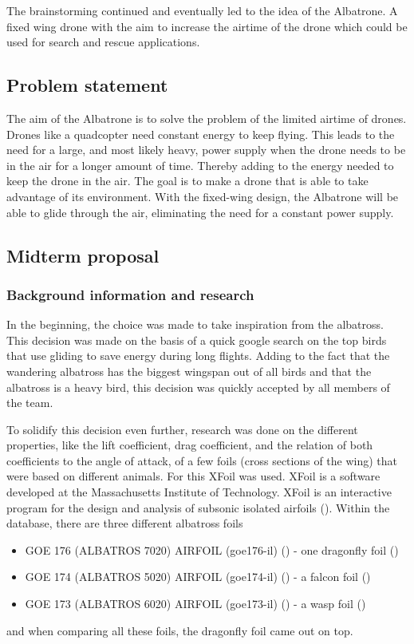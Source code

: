 The brainstorming continued and eventually led to the idea of the Albatrone. A fixed wing drone with the aim to increase the airtime of the drone which could be used for search and rescue applications.  

\subsection{Problem statement}
The aim of the Albatrone is to solve the problem of the limited airtime of drones. Drones like a quadcopter need constant energy to keep flying. This leads to the need for a large, and most likely heavy, power supply when the drone needs to be in the air for a longer amount of time. Thereby adding to the energy needed to keep the drone in the air. The goal is to make a drone that is able to take advantage of its environment. With the fixed-wing design, the Albatrone will be able to glide through the air, eliminating the need for a constant power supply. 

 

\subsection{Midterm proposal}
\subsubsection{Background information and research}

In the beginning, the choice was made to take inspiration from the albatross. This decision was made on the basis of a quick google search on the top birds that use gliding to save energy during long flights. Adding to the fact that the wandering albatross has the biggest wingspan out of all birds and that the albatross is a heavy bird, this decision was quickly accepted by all members of the team.  

To solidify this decision even further, research was done on the different properties, like the lift coefficient, drag coefficient, and the relation of both coefficients to the angle of attack, of a few foils (cross sections of the wing) that were based on different animals. For this XFoil was used. XFoil is a software developed at the Massachusetts Institute of Technology. XFoil is an interactive program for the design and analysis of subsonic isolated airfoils (\cite{XFoil}). Within the database, there are three different albatross foils
\begin{itemize}
    \item GOE 176 (ALBATROS 7020) AIRFOIL (goe176-il) (\cite{Foil_176}) - one dragonfly foil (\cite{Flcn})
    \item GOE 174 (ALBATROS 5020) AIRFOIL (goe174-il) (\cite{Foil_174}) - a falcon foil (\cite{Drfly})
    \item GOE 173 (ALBATROS 6020) AIRFOIL (goe173-il) (\cite{Foil_173}) - a wasp foil (\cite{Wasp})
\end{itemize}
and when comparing all these foils, the dragonfly foil came out on top.

